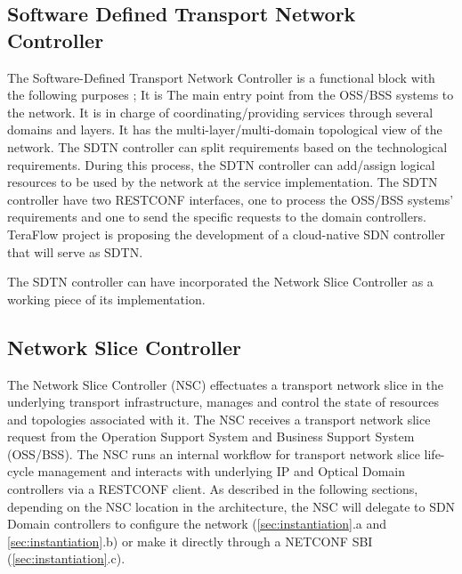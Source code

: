 \documentclass[journal,article,submit,moreauthors,pdftex]{Definitions/mdpi}
\begin{document}


\subsection{Software Defined Transport Network Controller} 
\label{sec:ifusionarch}

The Software-Defined Transport Network Controller is a functional block with the following purposes \cite{contreras2019ifusion}; It is The main entry point from the OSS/BSS systems to the network. It is in charge of coordinating/providing services through several domains and layers. It has the multi-layer/multi-domain topological view of the network. The SDTN controller can split requirements based on the technological requirements. During this process, the SDTN controller can add/assign logical resources to be used by the network at the service implementation. The SDTN controller have two RESTCONF interfaces, one to process the OSS/BSS systems' requirements and one to send the specific requests to the domain controllers. TeraFlow project \cite{vilalta21eucnc} is proposing the development of a cloud-native SDN controller that will serve as SDTN.


The SDTN controller can have incorporated the Network Slice Controller as a working piece of its implementation.

\subsection{Network Slice Controller} 

The Network Slice Controller (NSC) effectuates a transport network slice in the underlying transport infrastructure, manages and control the state of resources and topologies associated with it. The NSC receives a transport network slice request from the Operation Support System and Business Support System (OSS/BSS). The NSC runs an internal workflow for transport network slice life-cycle management and interacts with underlying IP and Optical Domain controllers via a RESTCONF client. As described in the following sections, depending on the NSC location in the architecture, the NSC will delegate to SDN Domain controllers to configure the network (\cref{sec:instantiation}.a and \cref{sec:instantiation}.b) or make it directly through a NETCONF SBI (\cref{sec:instantiation}.c). 
\end{document}
